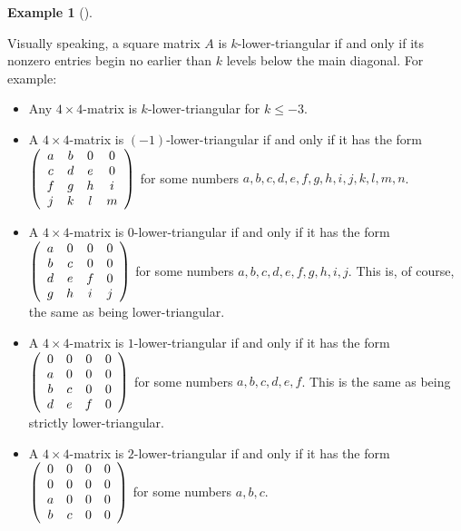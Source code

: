 \documentclass[numbers=enddot,12pt,final,onecolumn,notitlepage]{scrartcl}%
\theoremstyle{definition}
\newtheorem{exam}[theo]{Example}
\newenvironment{example}[1][]
{\begin{exam}[#1]\begin{leftbar}}
{\end{leftbar}\end{exam}}
\begin{document}
\begin{example}
Visually speaking, a square matrix $A$ is $k$-lower-triangular if and only if
its nonzero entries begin no earlier than $k$ levels below the main diagonal.
For example:

\begin{itemize}
\item Any $4\times4$-matrix is $k$-lower-triangular for $k\leq-3$.

\item A $4\times4$-matrix is $\left(  -1\right)  $-lower-triangular if and
only if it has the form $\left(
\begin{array}
[c]{cccc}%
a & b & 0 & 0\\
c & d & e & 0\\
f & g & h & i\\
j & k & l & m
\end{array}
\right)  $ for some numbers $a,b,c,d,e,f,g,h,i,j,k,l,m,n$.

\item A $4\times4$-matrix is $0$-lower-triangular if and only if it has the
form $\left(
\begin{array}
[c]{cccc}%
a & 0 & 0 & 0\\
b & c & 0 & 0\\
d & e & f & 0\\
g & h & i & j
\end{array}
\right)  $ for some numbers $a,b,c,d,e,f,g,h,i,j$. This is, of course, the
same as being lower-triangular.

\item A $4\times4$-matrix is $1$-lower-triangular if and only if it has the
form $\left(
\begin{array}
[c]{cccc}%
0 & 0 & 0 & 0\\
a & 0 & 0 & 0\\
b & c & 0 & 0\\
d & e & f & 0
\end{array}
\right)  $ for some numbers $a,b,c,d,e,f$. This is the same as being strictly lower-triangular.

\item A $4\times4$-matrix is $2$-lower-triangular if and only if it has the
form $\left(
\begin{array}
[c]{cccc}%
0 & 0 & 0 & 0\\
0 & 0 & 0 & 0\\
a & 0 & 0 & 0\\
b & c & 0 & 0
\end{array}
\right)  $ for some numbers $a,b,c$.


\end{itemize}
\end{example}
\end{document}
